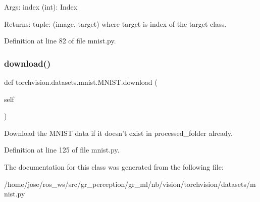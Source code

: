 \begin{DoxyVerb}Args:
    index (int): Index

Returns:
    tuple: (image, target) where target is index of the target class.
\end{DoxyVerb}
 

Definition at line 82 of file mnist.\+py.

\mbox{\label{classtorchvision_1_1datasets_1_1mnist_1_1MNIST_aeb0f2b944361212497bd448ed09af5b6}} 
\subsubsection{\texorpdfstring{download()}{download()}}
{\footnotesize\ttfamily def torchvision.\+datasets.\+mnist.\+M\+N\+I\+S\+T.\+download (\begin{DoxyParamCaption}\item[{}]{self }\end{DoxyParamCaption})}

\begin{DoxyVerb}Download the MNIST data if it doesn't exist in processed_folder already.\end{DoxyVerb}
 

Definition at line 125 of file mnist.\+py.



The documentation for this class was generated from the following file\+:\begin{DoxyCompactItemize}
\item 
/home/jose/ros\+\_\+ws/src/gr\+\_\+perception/gr\+\_\+ml/nb/vision/torchvision/datasets/mnist.\+py\end{DoxyCompactItemize}

